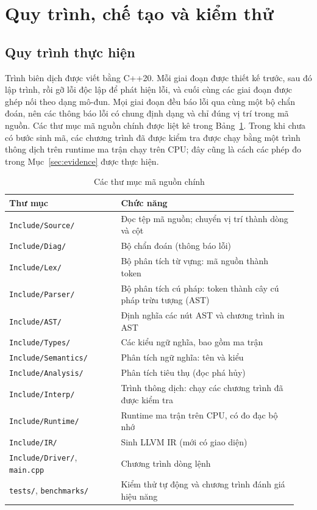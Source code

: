 \documentclass[a4paper]{article}
\begin{document}
	
	\section{Quy trình, chế tạo và kiểm thử}
	
	\subsection{Quy trình thực hiện}
	
	Trình biên dịch được viết bằng C++20. Mỗi giai đoạn được thiết kế trước, sau đó lập trình, rồi gỡ lỗi độc lập để phát hiện lỗi, và cuối cùng các giai đoạn được ghép nối theo dạng mô-đun. Mọi giai đoạn đều báo lỗi qua cùng một bộ chẩn đoán, nên các thông báo lỗi có chung định dạng và chỉ đúng vị trí trong mã nguồn. Các thư mục mã nguồn chính được liệt kê trong Bảng~\ref{tab:modules}. Trong khi chưa có bước sinh mã, các chương trình đã được kiểm tra được chạy bằng một trình thông dịch trên runtime ma trận chạy trên CPU; đây cũng là cách các phép đo trong Mục~\ref{sec:evidence} được thực hiện.

	\begin{table}[h]
		\centering
		\caption{Các thư mục mã nguồn chính}
		\label{tab:modules}
		\begin{tabular}{@{}>{\RaggedRight}p{0.36\linewidth} >{\RaggedRight}p{0.58\linewidth}@{}}
			\toprule
			Thư mục & Chức năng \\
			\midrule
			\texttt{Include/Source/} & Đọc tệp mã nguồn; chuyển vị trí thành dòng và cột \\
			\texttt{Include/Diag/} & Bộ chẩn đoán (thông báo lỗi) \\
			\texttt{Include/Lex/} & Bộ phân tích từ vựng: mã nguồn thành token \\
			\texttt{Include/Parser/} & Bộ phân tích cú pháp: token thành cây cú pháp trừu tượng (AST) \\
			\texttt{Include/AST/} & Định nghĩa các nút AST và chương trình in AST \\
			\texttt{Include/Types/} & Các kiểu ngữ nghĩa, bao gồm ma trận \\
			\texttt{Include/Semantics/} & Phân tích ngữ nghĩa: tên và kiểu \\
			\texttt{Include/Analysis/} & Phân tích tiêu thụ (đọc phá hủy) \\
			\texttt{Include/Interp/} & Trình thông dịch: chạy các chương trình đã được kiểm tra \\
			\texttt{Include/Runtime/} & Runtime ma trận trên CPU, có đo đạc bộ nhớ \\
			\texttt{Include/IR/} & Sinh LLVM IR (mới có giao diện) \\
			\texttt{Include/Driver/}, \texttt{main.cpp} & Chương trình dòng lệnh \\
			\texttt{tests/}, \texttt{benchmarks/} & Kiểm thử tự động và chương trình đánh giá hiệu năng \\
			\bottomrule
		\end{tabular}
	\end{table}
	
\end{document}
